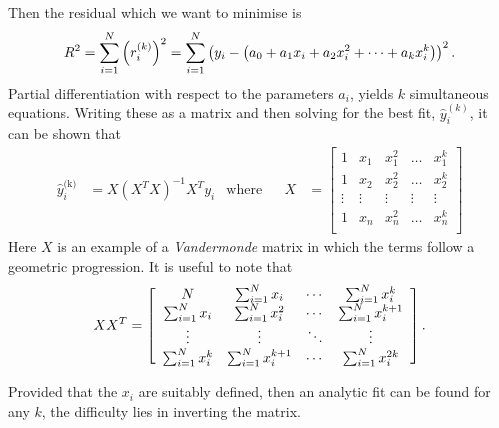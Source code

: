 \documentclass[../full_thesis/full_thesis.tex]{subfiles}
\begin{document}
\begin{subappendices}
Then the residual which we want to minimise is
\begin{equation}
R^{2} = \sum_{i=1}^{N}\left(r_i^{(k)}\right)^{2}
      = \sum_{i=1}^{N}\left(y_{i} - \left(a_{0} + a_{1}x_{i} + a_{2}x_{i}^{2} +
        \dots + a_{k} x_{i}^{k}\right)\right)^{2}.
\end{equation}
Partial differentiation with respect to the parameters $a_{i}$, yields $k$
simultaneous equations. Writing these as a matrix and then solving
for the best fit, $\hat{y}^(k)_i$, it can be shown \citep{WolframLeastSquares} that
\begin{align}
\hat{y}^{\textrm{(k)}}_{i} & = X \left(X^{T}X\right)^{-1} X^{T} y_{i} & \textrm{where} & &
X & = \left[\begin{array}{ccccc}
1 & x_{1} & x_{1}^{2} & \dots & x_{1}^{k} \\
1 & x_{2} & x_{2}^{2} & \dots & x_{2}^{k} \\
\vdots & \vdots & \vdots & \vdots & \vdots \\
1 & x_{n} & x_{n}^{2} & \dots & x_{n}^{k} \\
\end{array}\right]
\end{align}
Here $X$ is an example of a \emph{Vandermonde} matrix in which the terms follow
a geometric progression. It is useful to note that
\begin{equation}
XX^{T} = \left[\begin{array}{cccc}
N & \sum_{i=1}^{N}x_{i} & \cdots &  \sum_{i=1}^{N}x_{i}^{k} \\
\sum_{i=1}^{N}x_{i} & \sum_{i=1}^{N}x_{i}^{2} & \cdots &  \sum_{i=1}^{N}x_{i}^{k+1} \\
\vdots & \vdots & \ddots & \vdots \\
\sum_{i=1}^{N}x_{i}^{k} & \sum_{i=1}^{N}x_{i}^{k+1} & \cdots &  \sum_{i=1}^{N}x_{i}^{2k}
\end{array}\right].
\end{equation}

Provided that the $x_{i}$ are suitably defined, then an analytic fit can be
found for any $k$, the difficulty lies in inverting the matrix.


\end{subappendices}
\end{document}
